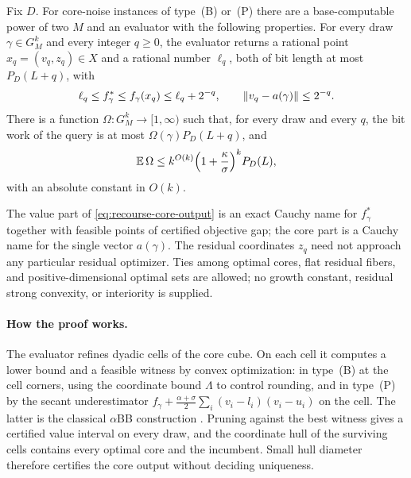 \begin{theorem}
\label{thm:recourse-core}
Fix $D$. For core-noise instances of type~(B) or~(P) there are a
base-computable power of two $M$ and an evaluator with the following
properties. For every draw $\gamma\in G_M^k$ and every integer $q\ge0$,
the evaluator returns a rational point $x_q=(v_q,z_q)\in X$ and a
rational number $\ell_q$, both of bit length at most $P_D(L+q)$, with
\begin{equation}
 \ell_q\le f_\gamma^*\le f_\gamma(x_q)\le\ell_q+2^{-q},
 \qquad
 \left\lVert v_q-a(\gamma)\right\rVert\le2^{-q}.
 \label{eq:recourse-core-output}
\end{equation}
There is a function $\Omega:G_M^k\to[1,\infty)$ such that, for every
draw and every $q$, the bit work of the query is at most
$\Omega(\gamma)P_D(L+q)$, and
\[
 \mathbb E\,\Omega\le k^{O(k)}\Bigl(1+\frac\kappa\sigma\Bigr)^kP_D(L),
\]
with an absolute constant in $O(k)$.
\end{theorem}

The value part of \eqref{eq:recourse-core-output} is an exact Cauchy
name for $f_\gamma^*$ together with feasible points of certified
objective gap; the core part is a Cauchy name for the single vector
$a(\gamma)$. The residual coordinates $z_q$ need not approach any
particular residual optimizer. Ties among optimal cores, flat residual
fibers, and positive-dimensional optimal sets are allowed; no growth
constant, residual strong convexity, or interiority is supplied.

\paragraph{How the proof works.}
The evaluator refines dyadic cells of the core cube. On each cell it
computes a lower bound and a feasible witness by convex optimization:
in type~(B) at the cell corners, using the coordinate bound $\Lambda$
to control rounding, and in type~(P) by the secant underestimator
$f_\gamma+\frac{\alpha+\sigma}2\sum_i(v_i-l_i)(v_i-u_i)$ on the cell.
The latter is the classical $\alpha$BB construction
\citep{AndroulakisMaranasFloudas1995}. Pruning against the best
witness gives a certified value interval on every draw, and the
coordinate hull of the surviving cells contains every optimal core and
the incumbent. Small hull diameter therefore certifies the core output
without deciding uniqueness.

